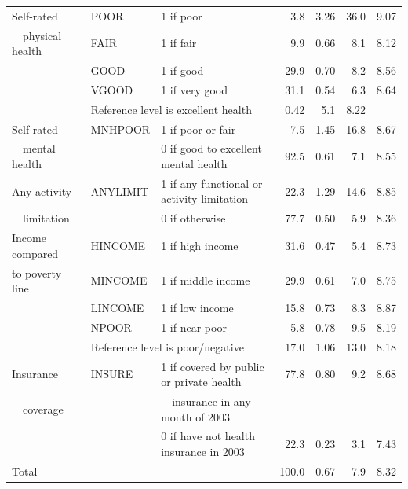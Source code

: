 \begin{table}
\begin{center}
\begin{tabular}{lllrrrr}
           \hline
Self-rated &       POOR &  1 if poor &        3.8 &       3.26 &       36.0 &       9.07 \\
~~physical health &       FAIR &  1 if fair &        9.9 &       0.66 &        8.1 &       8.12 \\
           &       GOOD &  1 if good &       29.9 &       0.70 &        8.2 &       8.56 \\
           &      VGOOD & 1 if very good &       31.1 &       0.54 &        6.3 &       8.64 \\
           &    \multicolumn{2}{l}{Reference level is excellent health}       25.4 &       0.42 &        5.1 &       8.22 \\
Self-rated &    MNHPOOR & 1 if poor or fair &        7.5 &       1.45 &       16.8 &       8.67 \\
~~mental health &            & 0 if good to excellent mental health &       92.5 &       0.61 &        7.1 &       8.55 \\
Any activity &   ANYLIMIT & 1 if any functional or activity limitation &       22.3 &       1.29 &       14.6 &       8.85 \\
~~limitation &            & 0 if otherwise &       77.7 &       0.50 &        5.9 &       8.36 \\
\hline
Income compared &    HINCOME & 1 if high income &       31.6 &       0.47 &        5.4 &       8.73 \\
to poverty line &    MINCOME & 1 if middle income &       29.9 &       0.61 &        7.0 &       8.75 \\
           &    LINCOME & 1 if low income &       15.8 &       0.73 &        8.3 &       8.87 \\
           &      NPOOR & 1 if near poor &        5.8 &       0.78 &        9.5 &       8.19 \\
           &    \multicolumn{2}{l}{Reference level is poor/negative }&       17.0 &       1.06 &       13.0 &       8.18 \\
           \hline
Insurance           &     INSURE & 1 if covered by public or private health &       77.8 &       0.80 &        9.2 &       8.68 \\
~~coverage& & ~~insurance in any month of 2003 \\
           &      & 0 if have not health insurance in 2003 &       22.3 &       0.23 &        3.1 &       7.43 \\
           \hline
     Total &            &            &      100.0 &       0.67 &        7.9 &       8.32
     \\\hline
\end{tabular}
\end{center}
 \setcounter{table}{1}
\end{table}


